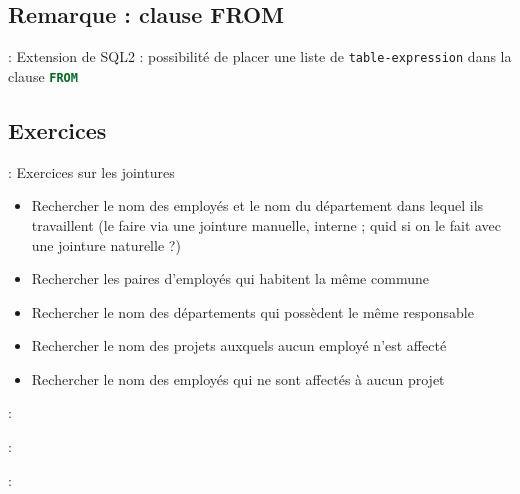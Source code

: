 \documentclass[10pt]{beamer}
\begin{document}
\subsection{Remarque : clause FROM}
\begin{frame}{\secname : \subsecname}
    Extension de SQL2 : possibilité de placer une liste de \lstinline[language=bnf]!table-expression! dans la clause \lstinline[language=sql]!FROM!
    
\end{frame}


\subsection{Exercices}
\begin{frame}{\secname : \subsecname}
    Exercices sur les jointures
    \begin{itemize}
        \item Rechercher le nom des employés et le nom du département dans lequel ils travaillent (le faire via une jointure manuelle, interne ; quid si on le fait avec une jointure naturelle ?)
        \item Rechercher les paires d'employés qui habitent la même commune
        \item Rechercher le nom des départements qui possèdent le même responsable
        \item Rechercher le nom des projets auxquels aucun employé n'est affecté
        \item Rechercher le nom des employés qui ne sont affectés à aucun projet
    \end{itemize}
\end{frame}
\begin{frame}[allowframebreaks]{\secname : \subsecname}
    
\end{frame}

\begin{frame}{\secname : \subsecname}
    
\end{frame}
\begin{frame}{\secname : \subsecname}
    
\end{frame}
\end{document}
